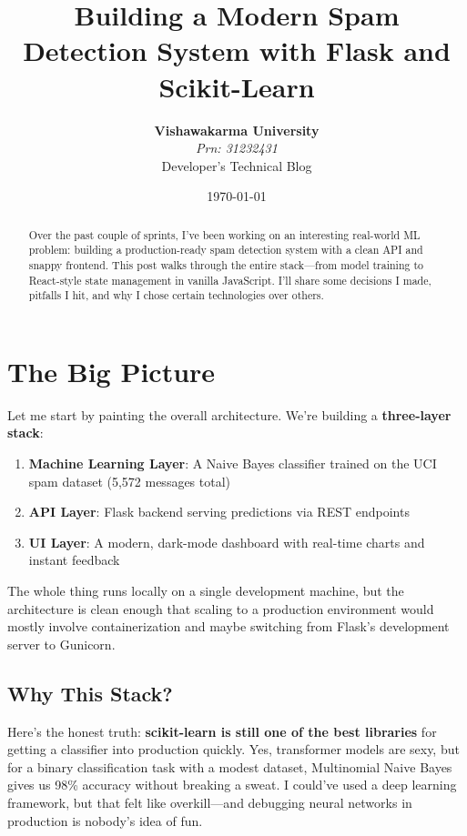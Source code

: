 \documentclass[12pt, a4paper]{article}
\title{\textbf{Building a Modern Spam Detection System with Flask and Scikit-Learn}}
\author{\textbf{Vishawakarma University} \\[0.5em] {\large \textit{Prn: 31232431}} \\[0.3em] Developer's Technical Blog}
\date{\today}
\begin{document}
\maketitle

\begin{abstract}
Over the past couple of sprints, I've been working on an interesting real-world ML problem: building a production-ready spam detection system with a clean API and snappy frontend. This post walks through the entire stack---from model training to React-style state management in vanilla JavaScript. I'll share some decisions I made, pitfalls I hit, and why I chose certain technologies over others.
\end{abstract}

\tableofcontents
\newpage

\section{The Big Picture}

Let me start by painting the overall architecture. We're building a \textbf{three-layer stack}:

\begin{enumerate}
    \item \textbf{Machine Learning Layer}: A Naive Bayes classifier trained on the UCI spam dataset (5,572 messages total)
    \item \textbf{API Layer}: Flask backend serving predictions via REST endpoints
    \item \textbf{UI Layer}: A modern, dark-mode dashboard with real-time charts and instant feedback
\end{enumerate}

The whole thing runs locally on a single development machine, but the architecture is clean enough that scaling to a production environment would mostly involve containerization and maybe switching from Flask's development server to Gunicorn.

\subsection{Why This Stack?}

Here's the honest truth: \textbf{scikit-learn is still one of the best libraries} for getting a classifier into production quickly. Yes, transformer models are sexy, but for a binary classification task with a modest dataset, Multinomial Naive Bayes gives us 98\% accuracy without breaking a sweat. I could've used a deep learning framework, but that felt like overkill---and debugging neural networks in production is nobody's idea of fun.
\end{document}
